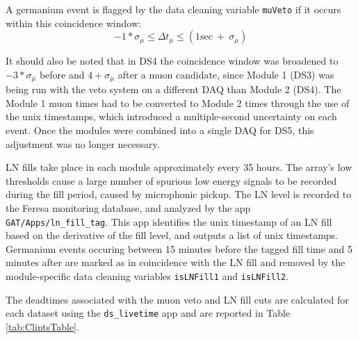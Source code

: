 \documentclass[notitlepage,rmp,aps,10pt]{revtex4-1}
\newcommand{\tty}{\texttt}
\begin{document}
A germanium event is flagged by the data cleaning variable \texttt{muVeto} if it occurs within this coincidence window:
\begin{equation}
  -1 * \sigma_{\mu} \leq  \Delta t_{\mu} \leq (1 \mathrm{sec}\ +\ \sigma_{\mu})
\end{equation}

It should also be noted that in DS4 the coincidence window was broadened to $-3 * \sigma_{\mu}$ before and $4 + \sigma_{\mu}$ after a muon candidate, since Module 1 (DS3) was being run with the veto system on a different DAQ than Module 2 (DS4).  The Module 1 muon times had to be converted to Module 2 times through the use of the unix timestamps, which introduced a multiple-second uncertainty on each event.  Once the modules were combined into a single DAQ for DS5, this adjustment was no longer necessary.

LN fills take place in each module approximately every 35 hours.
The array's low thresholds cause a large number of spurious low energy signals to be recorded during the fill period, caused by microphonic pickup.  The LN level is recorded to the Feresa monitoring database, and analyzed by the app \tty{GAT/Apps/ln\_fill\_tag}.
This app identifies the unix timestamp of an LN fill based on the derivative of the fill level, and outputs a list of unix timestamps. Germanium events occuring between 15 minutes before the tagged fill time and 5 minutes after are marked as in coincidence with the LN fill and removed by the module-specific data cleaning variables \texttt{isLNFill1} and \texttt{isLNFill2}.

The deadtimes associated with the muon veto and LN fill cuts are calculated for each dataset using the \tty{ds\_livetime} app and are reported in Table \ref{tab:ClintsTable}.
\end{document}
